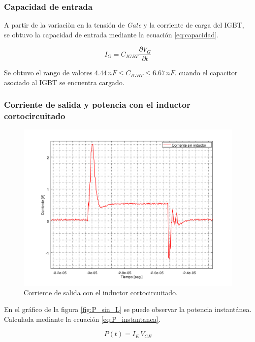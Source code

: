\documentclass[10pt,spanish,a4paper,openany,notitlepage]{article}
\begin{document}
\subsubsection{Capacidad de entrada}

A partir de la variaciòn en la tensión de \emph{Gate} y la corriente de
carga del IGBT, se obtuvo la capacidad de entrada mediante la ecuación
\ref{eq:capacidad}.

\begin{equation}
I_G = C_{IGBT} \frac{\partial V_G}{\partial t}
\label{eq:capacidad}
\end{equation}

Se obtuvo el rango de valores $4.44\, \unit{nF} \leqslant C_{IGBT} \leqslant 6.67\, \unit{nF}$.
cuando el capacitor asociado al IGBT se encuentra cargado.

\subsubsection{Corriente de salida y potencia con el inductor cortocircuitado}

\begin{figure}[H]
\centering
\includegraphics[scale=0.65]{./Octave/IGBT/corriente_sin_L.png}
\caption{Corriente de salida con el inductor cortocircuitado.}
\label{fig:corriente_sin_L}
\end{figure}

En el gráfico de la figura \ref{fig:P_sin_L} se puede observar la potencia 
instantánea. Calculada mediante la ecuación \ref{eq:P_instantanea}.

\begin{equation}
P(t) = I_{E}\, V_{CE}
\label{eq:P_instantanea}
\end{equation}
\end{document}
